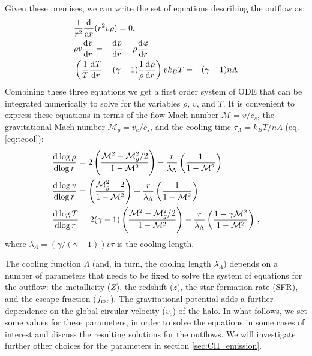 Given these premises, we can write the set of equations describing the outflow as: 
\begin{subequations}
\begin{align}
&\frac{1}{r^2}\frac{\mathrm{d} ^{}}{\mathrm{d} {r}^{}}(r^2v\rho) =0, \label{eq:neweul1}\\
&\rho v\frac{\mathrm{d} ^{}v}{\mathrm{d} {r}^{}} = -\frac{\mathrm{d} ^{}p}{\mathrm{d} {r}^{}} - \rho \frac{\mathrm{d} ^{}\varphi}{\mathrm{d} {r}^{}} \label{eq:neweul2}\\
&\left(\frac{1}{T}\frac{\mathrm{d} ^{}T}{\mathrm{d} {r}^{}} - (\gamma-1)\frac{1}{\rho}\frac{\mathrm{d} ^{}\rho}{\mathrm{d} {r}^{}}\right) v k_B T = - (\gamma-1) n \Lambda \label{eq:neweul3}
\end{align}
\end{subequations}
Combining these three equations we get a first order system of ODE that can be integrated numerically to solve for the variables $\rho$, $v$, and $T$. It is convenient to express these equations in terms of the flow Mach number $\mathcal{M}=v/c_s$, the gravitational Mach number $\mathcal{M}_g=v_c/c_s$, and the cooling time $\tau_\Lambda =  k_B T/n\Lambda$ (eq. \ref{eq:tcool}):
\begin{subequations}
\begin{align}
&\frac{\mathrm{d} ^{}\log\rho}{\mathrm{d} {\log r}^{}}=2 \left(\frac{\mathcal{M}^2-\mathcal{M}_g^2/2}{1-\mathcal{M}^2}\right)- \frac{r}{\lambda_\Lambda}\left(\frac{1}{1-\mathcal{M}^2}\right) \label{eq:cooling_model_equations_n}\\
&\frac{\mathrm{d} ^{}\log v}{\mathrm{d} {\log r}^{}}=\left(\frac{\mathcal{M}_g^2-2}{1-\mathcal{M}^2}\right)+\frac{r}{\lambda_\Lambda}\left(\frac{1}{1-\mathcal{M}^2}\right) \label{eq:cooling_model_equations_v}\\
&\frac{\mathrm{d} ^{}\log T}{\mathrm{d} {\log r}^{}}={2(\gamma-1)}\left(\frac{\mathcal{M}^2-\mathcal{M}_g^2/2}{1-\mathcal{M}^2}\right)-\frac{r}{\lambda_\Lambda}\left(\frac{1-\gamma\mathcal{M}^2}{1-\mathcal{M}^2}\right)\,, \label{eq:cooling_model_equations_T}
\end{align}
\label{eq:cooling_model_equations}
\end{subequations}
where $\lambda_\Lambda=(\gamma/(\gamma-1)) v \tau$ is the cooling length.

The cooling function $\Lambda$ (and, in turn, the cooling length $\lambda_\Lambda$) depends on a number of parameters that needs to be fixed to solve the system of equations for the outflow: the metallicity ($Z$), the redshift ($z$), the star formation rate (SFR), and the escape fraction ($f_{\rm esc}$). The gravitational potential adds a further dependence on the global circular velocity ($v_c$) of the halo. In what follows, we set some values for these parameters, in order to solve the equations in some cases of interest and discuss the resulting solutions for the outflows. We will investigate further other choices for the parameters in section \ref{sec:CII_emission}. 

